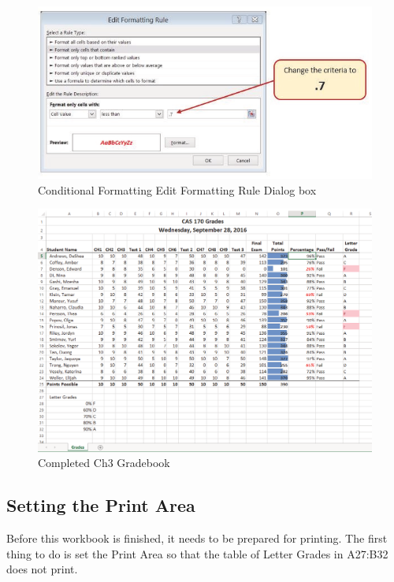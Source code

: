 \begin{figure}[H]
	\centering
	\includegraphics[width=\maxwidth{.95\linewidth}]{gfx/ch03_fig24}
	\caption{Conditional Formatting Edit Formatting Rule Dialog box}
	\label{03:fig24}
\end{figure}

\begin{figure}[H]
	\centering
	\includegraphics[width=\maxwidth{.95\linewidth}]{gfx/ch03_fig25}
	\caption{Completed Ch3 Gradebook}
	\label{03:fig25}
\end{figure}

\subsection{Setting the Print Area}

Before this workbook is finished, it needs to be prepared for printing. The first thing to do is set the Print Area so that the table of Letter Grades in \textsf{A27:B32} does not print.


